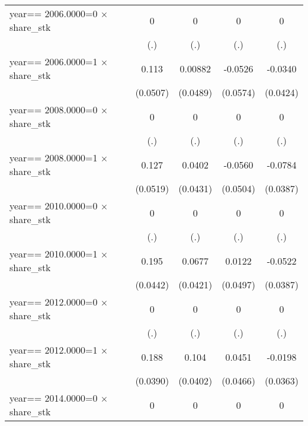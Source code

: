 \begin{table}[htbp]
\begin{tabular}{l*{4}{c}}
\addlinespace
year==  2006.0000=0 $\times$ share\_stk&        0         &        0         &        0         &        0         \\
                &      (.)         &      (.)         &      (.)         &      (.)         \\
\addlinespace
year==  2006.0000=1 $\times$ share\_stk&    0.113\sym{**} &  0.00882         &  -0.0526         &  -0.0340         \\
                & (0.0507)         & (0.0489)         & (0.0574)         & (0.0424)         \\
\addlinespace
year==  2008.0000=0 $\times$ share\_stk&        0         &        0         &        0         &        0         \\
                &      (.)         &      (.)         &      (.)         &      (.)         \\
\addlinespace
year==  2008.0000=1 $\times$ share\_stk&    0.127\sym{**} &   0.0402         &  -0.0560         &  -0.0784\sym{**} \\
                & (0.0519)         & (0.0431)         & (0.0504)         & (0.0387)         \\
\addlinespace
year==  2010.0000=0 $\times$ share\_stk&        0         &        0         &        0         &        0         \\
                &      (.)         &      (.)         &      (.)         &      (.)         \\
\addlinespace
year==  2010.0000=1 $\times$ share\_stk&    0.195\sym{***}&   0.0677         &   0.0122         &  -0.0522         \\
                & (0.0442)         & (0.0421)         & (0.0497)         & (0.0387)         \\
\addlinespace
year==  2012.0000=0 $\times$ share\_stk&        0         &        0         &        0         &        0         \\
                &      (.)         &      (.)         &      (.)         &      (.)         \\
\addlinespace
year==  2012.0000=1 $\times$ share\_stk&    0.188\sym{***}&    0.104\sym{***}&   0.0451         &  -0.0198         \\
                & (0.0390)         & (0.0402)         & (0.0466)         & (0.0363)         \\
\addlinespace
year==  2014.0000=0 $\times$ share\_stk&        0         &        0         &        0         &        0         \\

\end{tabular}
\end{table}
